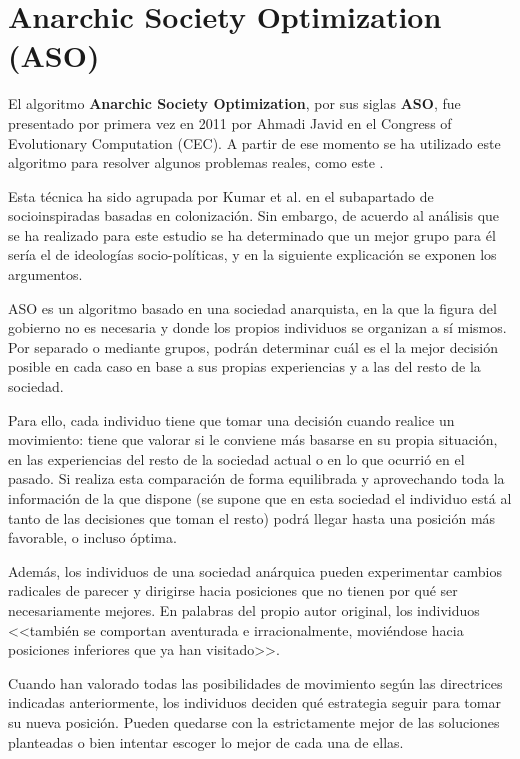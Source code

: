 \section{Anarchic Society Optimization (ASO)}

El algoritmo \textbf{Anarchic Society Optimization}, por sus siglas \textbf{ASO}, fue presentado por primera vez en 2011 por Ahmadi Javid \cite{aso-conference} en el Congress of Evolutionary Computation (CEC). A partir de ese momento se ha utilizado este algoritmo para resolver algunos problemas reales, como este \cite{aso-article}.

Esta técnica ha sido agrupada por Kumar et al. \cite{socio-evolution-algorithm} en el subapartado de socioinspiradas basadas en colonización. Sin embargo, de acuerdo al análisis que se ha realizado para este estudio se ha determinado que un mejor grupo para él sería el de ideologías socio-políticas, y en la siguiente explicación se exponen los argumentos.

ASO es un algoritmo basado en una sociedad anarquista, en la que la figura del gobierno no es necesaria y donde los propios individuos se organizan a sí mismos. Por separado o mediante grupos, podrán determinar cuál es el la mejor decisión posible en cada caso en base a sus propias experiencias y a las del resto de la sociedad.

Para ello, cada individuo tiene que tomar una decisión cuando realice un movimiento: tiene que valorar si le conviene más basarse en su propia situación, en las experiencias del resto de la sociedad actual o en lo que ocurrió en el pasado. Si realiza esta comparación de forma equilibrada y aprovechando toda la información de la que dispone (se supone que en esta sociedad el individuo está al tanto de las decisiones que toman el resto) podrá llegar hasta una posición más favorable, o incluso óptima.

Además, los individuos de una sociedad anárquica pueden experimentar cambios radicales de parecer y dirigirse hacia posiciones que no tienen por qué ser necesariamente mejores. En palabras del propio autor original, los individuos <<también se comportan aventurada e irracionalmente, moviéndose hacia posiciones inferiores que ya han visitado>>. 

Cuando han valorado todas las posibilidades de movimiento según las directrices indicadas anteriormente, los individuos deciden qué estrategia seguir para tomar su nueva posición. Pueden quedarse con la estrictamente mejor de las soluciones planteadas o bien intentar escoger lo mejor de cada una de ellas.

